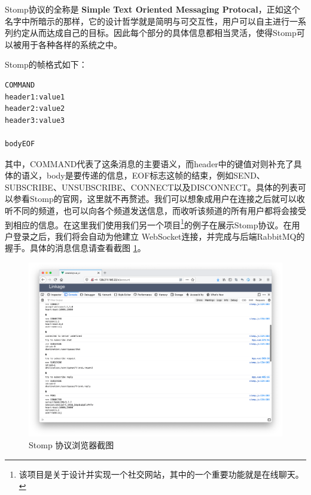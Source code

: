 \documentclass{ctexrep}
\begin{document}
	Stomp协议的全称是 \textbf{Simple Text Oriented Messaging Protocal}，正如这个名字中所暗示的那样，它的设计哲学就是简明与可交互性，用户可以自主进行一系列约定从而达成自己的目标。因此每个部分的具体信息都相当灵活，使得Stomp可以被用于各种各样的系统之中。
	
	Stomp的帧格式如下：
	\begin{lstlisting}
COMMAND
header1:value1
header2:value2
header3:value3

bodyEOF
	\end{lstlisting}
	
	其中，COMMAND代表了这条消息的主要语义，而header中的键值对则补充了具体的语义，body是要传递的信息，EOF标志这帧的结束，例如SEND、SUBSCRIBE、UNSUBSCRIBE、CONNECT以及DISCONNECT。具体的列表可以参看Stomp的官网，这里就不再赘述。我们可以想象成用户在连接之后就可以收听不同的频道，也可以向各个频道发送信息，而收听该频道的所有用户都将会接受到相应的信息。在这里我们使用我们另一个项目\footnote{该项目是关于设计并实现一个社交网站，其中的一个重要功能就是在线聊天。}的例子在展示Stomp协议。在用户登录之后，我们将会自动为他建立 WebSocket连接，并完成与后端RabbitMQ的握手。具体的消息信息请查看截图 \ref{fig:stompdemo}。
	\begin{figure}[H]
		\centering
		\includegraphics[width=0.9\linewidth]{img/stompDemo}
		\caption{Stomp 协议浏览器截图}
		\label{fig:stompdemo}
	\end{figure}
\end{document}
